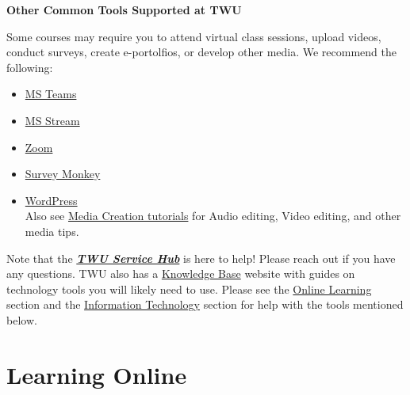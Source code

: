 \documentclass[
]{book}
\providecommand{\tightlist}{%
  \setlength{\itemsep}{0pt}\setlength{\parskip}{0pt}}
\theoremstyle{definition}
\theoremstyle{definition}
\theoremstyle{definition}
\theoremstyle{definition}
\theoremstyle{remark}
\begin{document}
\textbf{Other Common Tools Supported at TWU}

Some courses may require you to attend virtual class sessions, upload videos, conduct surveys, create e-portolfios, or develop other media. We recommend the following:

\begin{itemize}
\tightlist
\item
  \href{https://trinitywestern.teamdynamix.com/TDClient/1904/Portal/KB/?CategoryID=17821\&SIDs=11353}{MS Teams}\\
\item
  \href{https://trinitywestern.teamdynamix.com/TDClient/1904/Portal/KB/?CategoryID=23454}{MS Stream}\\
\item
  \href{https://trinitywestern.teamdynamix.com/TDClient/1904/Portal/KB/?CategoryID=17478}{Zoom}\\
\item
  \href{https://trinitywestern.teamdynamix.com/TDClient/1904/Portal/KB/ArticleDet?ID=47076}{Survey Monkey}\\
\item
  \href{https://trinitywestern.teamdynamix.com/TDClient/1904/Portal/KB/?CategoryID=4746}{WordPress}\\
  Also see \href{https://trinitywestern.teamdynamix.com/TDClient/1904/Portal/KB/?CategoryID=6940}{Media Creation tutorials} for Audio editing, Video editing, and other media tips.
\end{itemize}

\begin{feedback}
Note that the
\href{https://trinitywestern.teamdynamix.com/TDClient/1904/Portal/KB/ArticleDet?ID=16267}{\textbf{\emph{TWU
Service Hub}}} is here to help! Please reach out if you have any
questions. TWU also has a
\href{https://trinitywestern.teamdynamix.com/TDClient/1904/Portal/KB/}{Knowledge
Base} website with guides on technology tools you will likely need to
use. Please see the
\href{https://trinitywestern.teamdynamix.com/TDClient/1904/Portal/KB/?CategoryID=4747}{Online
Learning} section and the
\href{https://trinitywestern.teamdynamix.com/TDClient/1904/Portal/KB/?CategoryID=21800}{Information
Technology} section for help with the tools mentioned below.
\end{feedback}

\hypertarget{learning-online}{%
\section*{Learning Online}\label{learning-online}}
\end{document}
